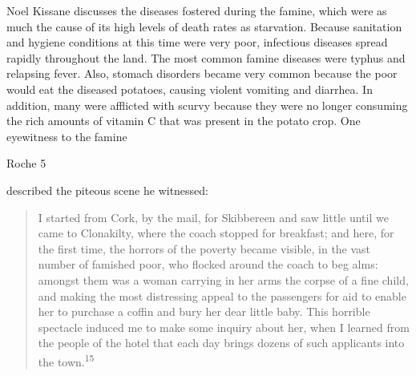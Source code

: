 \begin{Spacing}{1.5}

\hspace{.4in}Noel Kissane discusses the diseases fostered during the famine, which were as much the cause of its high levels of death rates as starvation. Because sanitation and hygiene conditions at this time were very poor, infectious diseases spread rapidly throughout the land. The most common famine diseases were typhus and relapsing fever. Also, stomach disorders became very common because the poor would eat the diseased potatoes, causing violent vomiting and diarrhea. In addition, many were afflicted with scurvy because they were no longer consuming the rich amounts of vitamin C that was present in the potato crop. One eyewitness to the famine 

\newpage
\thispagestyle{empty}
\begin{flushright}Roche 5\end{flushright}

described the piteous scene he witnessed:

\begin{quote}I started from Cork, by the mail, for Skibbereen and saw little until we came to Clonakilty, where the coach stopped for breakfast; and here, for the first time, the horrors of the poverty became visible, in the vast number of famished poor, who flocked around the coach to beg alms: amongst them was a woman carrying in her arms the corpse of a fine child, and making the most distressing appeal to the passengers for aid to enable her to purchase a coffin and bury her dear little baby. This horrible spectacle induced me to make some inquiry about her, when I learned from the people of the hotel that each day brings dozens of such applicants into the town.\textsuperscript{15} \end{quote}


\end{Spacing}
